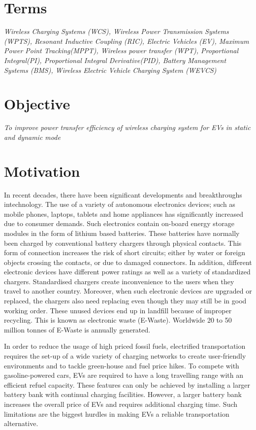 \documentclass[12pt]{article}
\begin{document}

\tableofcontents
\newpage

\renewcommand{\baselinestretch}{1.5}
\section{Terms}
\textit{Wireless Charging Systems (WCS), 
	Wireless Power Transmission Systems (WPTS), 
	Resonant Inductive Coupling (RIC),
	Electric Vehicles (EV), 
	Maximum Power Point Tracking(MPPT),
	Wireless power transfer (WPT),
	Proportional Integral(PI),
	Proportional Integral Derivative(PID),
	Battery Management Systems (BMS),
Wireless Electric Vehicle Charging System (WEVCS)}


\section{Objective}
\textit{To improve power transfer efficiency of wireless charging system for EVs in static and dynamic mode}

\section{Motivation}
In recent decades, there have been significant developments and breakthroughs intechnology. The use of a variety of autonomous electronics devices; such as mobile phones, laptops, tablets and home appliances has significantly increased due to consumer demands. Such electronics contain on-board energy storage modules in the form of lithium based batteries. These batteries have normally been charged by conventional battery chargers through physical contacts. This form of connection increases the risk of short circuits; either by water or foreign objects crossing the contacts, or due to damaged connectors. In addition, different electronic devices have different power ratings as well as a variety of standardized chargers. Standardised chargers create inconvenience to the users when they travel to another country. Moreover, when such electronic devices are upgraded or replaced, the chargers also need replacing even though they may still be in good working order. These unused devices end up in landfill because of improper recycling. This is known as electronic waste (E-Waste). Worldwide 20 to 50 million tonnes of E-Waste is annually generated.

In order to reduce the usage of high priced fossil fuels, electrified transportation requires the set-up of a wide variety of charging networks to create user-friendly environments and to tackle green-house and fuel price hikes. To compete with gasoline-powered cars, EVs are required to have a long travelling range with an efficient refuel capacity. These features can only be achieved by installing a larger battery bank with continual charging facilities. However, a larger battery bank increases the overall price of EVs and requires additional charging time. Such limitations are the biggest hurdles in making EVs a reliable transportation alternative. 
\end{document}
